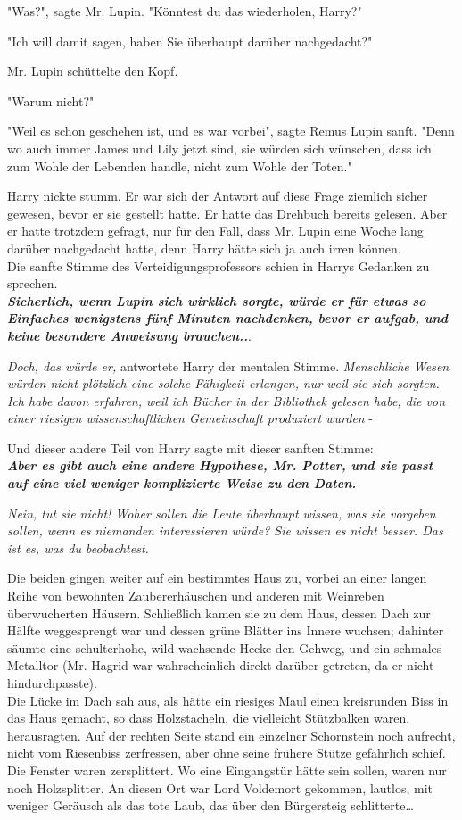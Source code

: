 {"Was?", sagte Mr. Lupin. "Könntest du das wiederholen, Harry?"

"Ich will damit sagen, haben Sie überhaupt darüber nachgedacht?"

Mr. Lupin schüttelte den Kopf.

"Warum nicht?"

"Weil es schon geschehen ist, und es war vorbei", sagte Remus Lupin sanft. "Denn wo auch immer James und Lily jetzt sind, sie würden sich wünschen, dass ich zum Wohle der Lebenden handle, nicht zum Wohle der Toten."

Harry nickte stumm. Er war sich der Antwort auf diese Frage ziemlich sicher gewesen, bevor er sie gestellt hatte. Er hatte das Drehbuch bereits gelesen. Aber er hatte trotzdem gefragt, nur für den Fall, dass Mr. Lupin eine Woche lang darüber nachgedacht hatte, denn Harry hätte sich ja auch irren können.\\ Die sanfte Stimme des Verteidigungsprofessors schien in Harrys Gedanken zu sprechen.\\ \textbf{\emph{Sicherlich, wenn Lupin sich wirklich sorgte, würde er für etwas so Einfaches wenigstens fünf Minuten nachdenken, bevor er aufgab, und keine besondere Anweisung brauchen..}}.

\emph{Doch, das würde er,} antwortete Harry der mentalen Stimme. \emph{Menschliche Wesen würden nicht plötzlich eine solche Fähigkeit erlangen, nur weil sie sich sorgten. Ich habe davon erfahren, weil ich Bücher in der Bibliothek gelesen habe, die von einer riesigen wissenschaftlichen Gemeinschaft produziert wurden} -

Und dieser andere Teil von Harry sagte mit dieser sanften Stimme:\\ \textbf{\emph{Aber es gibt auch eine andere Hypothese, Mr. Potter, und sie passt auf eine viel weniger komplizierte Weise zu den Daten.}}

\emph{Nein, tut sie nicht! Woher sollen die Leute überhaupt wissen, was sie vorgeben sollen, wenn es niemanden interessieren würde? Sie wissen es nicht besser. Das ist es, was du beobachtest.}

Die beiden gingen weiter auf ein bestimmtes Haus zu, vorbei an einer langen Reihe von bewohnten Zaubererhäuschen und anderen mit Weinreben überwucherten Häusern. Schließlich kamen sie zu dem Haus, dessen Dach zur Hälfte weggesprengt war und dessen grüne Blätter ins Innere wuchsen; dahinter säumte eine schulterhohe, wild wachsende Hecke den Gehweg, und ein schmales Metalltor (Mr. Hagrid war wahrscheinlich direkt darüber getreten, da er nicht hindurchpasste).\\ Die Lücke im Dach sah aus, als hätte ein riesiges Maul einen kreisrunden Biss in das Haus gemacht, so dass Holzstacheln, die vielleicht Stützbalken waren, herausragten. Auf der rechten Seite stand ein einzelner Schornstein noch aufrecht, nicht vom Riesenbiss zerfressen, aber ohne seine frühere Stütze gefährlich schief. Die Fenster waren zersplittert. Wo eine Eingangstür hätte sein sollen, waren nur noch Holzsplitter. An diesen Ort war Lord Voldemort gekommen, lautlos, mit weniger Geräusch als das tote Laub, das über den Bürgersteig schlitterte…

}
